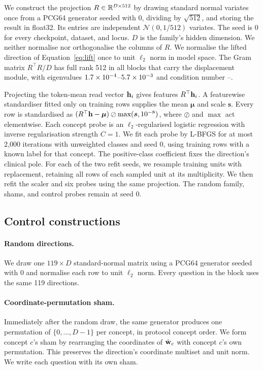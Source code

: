 \documentclass{article}
\begin{document}
We construct the projection $R\in\mathbb{R}^{D\times512}$ by drawing standard normal variates once from a PCG64 generator seeded with $0$, dividing by $\sqrt{512}$, and storing the result in float32. Its entries are independent $\mathcal{N}(0,1/512)$ variates. The seed is $0$ for every checkpoint, dataset, and locus. $D$ is the family's hidden dimension. We neither normalise nor orthogonalise the columns of $R$. We normalise the lifted direction of Equation~\ref{eq:lift} once to unit $\ell_2$ norm in model space. The Gram matrix $R^{\top}R/D$ has full rank 512 in all \cfAltdirdBlocks{} blocks that carry the displacement module, with eigenvalues $1.7\times10^{-4}$--$5.7\times10^{-3}$ and condition number \cfAltdirdCondMin{}--\cfAltdirdCondMax{}.

Projecting the token-mean read vector $\mathbf{h}_i$ gives features $R^{\top}\mathbf{h}_i$. A featurewise standardiser fitted only on training rows supplies the mean $\boldsymbol\mu$ and scale $\boldsymbol s$. Every row is standardised as $(R^{\top}\mathbf{h}-\boldsymbol\mu)\oslash\max(\boldsymbol s,10^{-8})$, where $\oslash$ and $\max$ act elementwise. Each concept probe is an $\ell_2$-regularised logistic regression with inverse regularisation strength $C=1$. We fit each probe by L-BFGS for at most 2{,}000 iterations with unweighted classes and seed $0$, using training rows with a known label for that concept. The positive-class coefficient fixes the direction's clinical pole. For each of the two refit seeds, we resample training units with replacement, retaining all rows of each sampled unit at its multiplicity. We then refit the scaler and six probes using the same projection. The random family, shams, and control probes remain at seed 0.

\subsection{Control constructions}
\label{app:repro-controls}

\paragraph{Random directions.} We draw one $119\times D$ standard-normal matrix using a PCG64 generator seeded with $0$ and normalise each row to unit $\ell_2$ norm. Every question in the block uses the same 119 directions.

\paragraph{Coordinate-permutation sham.} Immediately after the random draw, the same generator produces one permutation of $\{0,\dots,D{-}1\}$ per concept, in protocol concept order. We form concept $c$'s sham by rearranging the coordinates of $\hat{\mathbf{w}}_c$ with concept $c$'s own permutation. This preserves the direction's coordinate multiset and unit norm. We write each question with its own sham.
\end{document}
